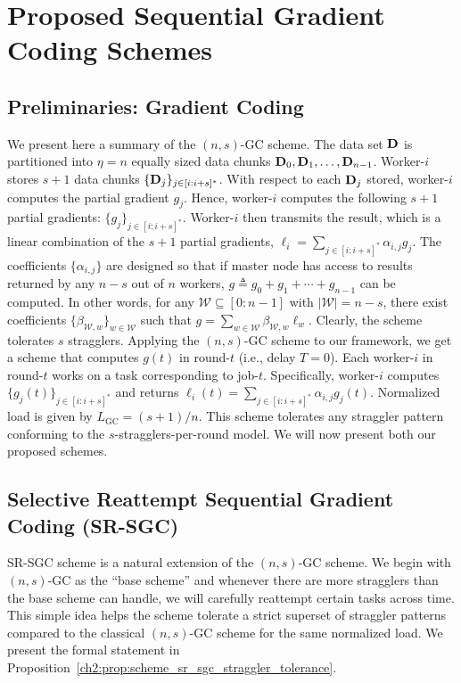 \section{Proposed Sequential Gradient Coding Schemes}
\subsection{Preliminaries: Gradient Coding}\label{ch2:sec:GC_prelim}

We present here a summary of the $(n,s)$-GC scheme. The data set $\mathbf{D}$ is partitioned into $\eta = n$ equally sized data chunks $\mathbf{D}_0,\mathbf{D}_1,\ldots,\mathbf{D}_{n-1}$.  Worker-$i$ stores $s+1$ data chunks  $\{\mathbf{D}_j\}_{j\in[i:i+s]^*}$. With respect to each $\mathbf{D}_j$ stored, worker-$i$ computes the partial gradient $g_j$. Hence, worker-$i$ computes the following $s+1$ partial gradients: $\{g_j\}_{j\in[i:i+s]^*}$. Worker-$i$ then transmits the result, which is a linear combination of the $s+1$ partial gradients, $\ell_i=\sum_{j\in[i:i+s]^*}\alpha_{i,j}g_j$. The coefficients $\{\alpha_{i,j}\}$ are designed so that if master node has access to results returned by any $n-s$ out of $n$ workers, $g\triangleq g_0+g_1+\cdots+g_{n-1}$ can be computed. In other words, for any $\mathcal{W}\subseteq [0:n-1]$ with $|\mathcal{W}|=n-s$, there exist coefficients $\{\beta_{\mathcal{W},w}\}_{w\in\mathcal{W}}$ such that $g=\sum_{w\in\mathcal{W}}\beta_{\mathcal{W},w}\ell_w$. Clearly, the scheme tolerates $s$ stragglers. Applying the $(n,s)$-GC scheme to our framework, we get a scheme that computes $g(t)$ in round-$t$ (i.e., delay $T=0$). Each worker-$i$ in round-$t$ works on a task corresponding to job-$t$. Specifically, worker-$i$ computes $\{g_j(t)\}_{j\in[i:i+s]^*}$ and returns $\ell_i(t)=\sum_{j\in[i:i+s]^*}\alpha_{i,j}g_j(t)$. Normalized load is given by $L_\text{GC}={(s+1)}/{n}$. This scheme tolerates any straggler pattern conforming to the $s$-stragglers-per-round model. We will now present both our proposed schemes.

\subsection{Selective Reattempt Sequential Gradient Coding (SR-SGC)}\label{ch2:sec:sr_sgc}

SR-SGC scheme is a natural extension of the $(n,s)$-GC scheme. We begin with $(n,s)$-GC as the ``base scheme'' and whenever there are more stragglers than the base scheme can handle, we will carefully reattempt certain tasks across time. This simple idea helps the scheme tolerate a strict superset of straggler patterns compared to the classical $(n,s)$-GC scheme for the same normalized load. We present the formal statement in Proposition~\ref{ch2:prop:scheme_sr_sgc_straggler_tolerance}.

